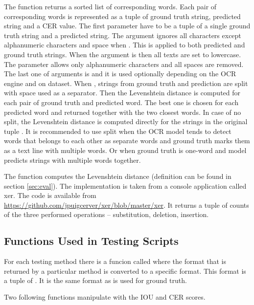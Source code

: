 The function  returns a sorted list of corresponding words. Each pair of corresponding words is represented as a tuple of ground truth string, predicted string and a CER value. The first parameter have to be a tuple of a single ground truth string and a predicted string. The argument  ignores all characters except alphanumeric characters and space when . This is applied to both predicted and ground truth strings. When the argument  is  then all texts are set to lowercase. The  parameter allows only alphanumeric characters and all spaces are removed. The last one of arguments is  and it is used optionally depending on the OCR engine and on dataset. When , strings from ground truth and prediction are split with space used as a separator. Then the Levenshtein distance is computed for each pair of ground truth and predicted word. The best one is chosen for each predicted word and returned together with the two closest words. In case of no split, the Levenshtein distance is computed directly for the strings in the original tuple . It is recommended to use split when the OCR model tends to detect words that belongs to each other as separate words and ground truth marks them as a text line with multiple words. Or when ground truth is one-word and model predicts strings with multiple words together.

The function  computes the Levenshtein distance (definition can be found in section \ref*{sec:eval}). The implementation is taken from a console application called xer. The code is available from \url{https://github.com/jpuigcerver/xer/blob/master/xer}. It returns a tuple of counts of the three performed operations --  substitution, deletion, insertion.

\subsection*{Functions Used in Testing Scripts}

For each testing method there is a funcion called  where the format that is returned by a particular method is converted to a specific format. This format is a tuple of . It is the same format as is used for ground truth.

Two following functions manipulate with the IOU and CER scores.

